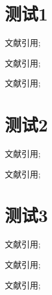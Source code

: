 \documentclass{ctexart}
\begin{document}
\tableofcontents

\section{测试1}
文献引用\parencite{CHEN20092657}; 

文献引用\parencite{CHEN20092657,Tang2023,Yin2021}; 

文献引用\parencite{CHEN20092657,Tang2023,ZHU2023119062};


\section{测试2}
文献引用\supercite{CHEN20092657}; 

文献引用\supercite{CHEN20092657,Tang2023}; 

\section{测试3}
文献引用\cite{CHEN20092657}; 

文献引用\cite{CHEN20092657,Tang2023,Yin2021}; 

文献引用\cite{CHEN20092657,Tang2023,ZHU2023119062};
  
\newpage
\printbibliography[heading=bibintoc]
\end{document}
